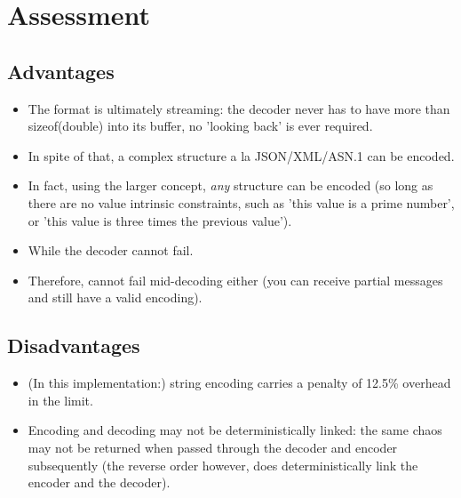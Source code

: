\section{Assessment}

\subsection{Advantages}

\begin{itemize}
\item The format is ultimately streaming: the decoder never has to have
      more than sizeof(double) into its buffer, no 'looking back' is
      ever required.
\item In spite of that, a complex structure a la JSON/XML/ASN.1 can be
      encoded.
\item In fact, using the larger concept, \textit{any} structure can
      be encoded (so long as there are no value intrinsic constraints, such
      as 'this value is a prime number', or 'this value is three times the
      previous value').
\item While the decoder cannot fail.
\item Therefore, cannot fail mid-decoding either (you can receive
      partial messages and still have a valid encoding).
\end{itemize}

\subsection{Disadvantages}

\begin{itemize}
\item (In this implementation:)
      string encoding carries a penalty of 12.5\% overhead in the limit.
\item Encoding and decoding may not be deterministically linked: the same
      chaos may not be returned when passed through the decoder and encoder
      subsequently (the reverse order however, does deterministically link
      the encoder and the decoder).
\end{itemize}
